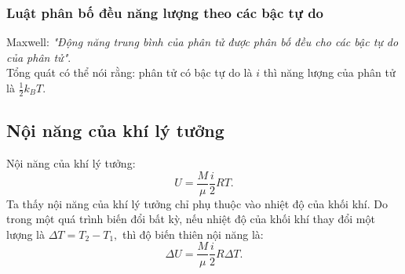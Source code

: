 \subsubsection{Luật phân bố đều năng lượng theo các bậc tự do}
Maxwell: \textit{"Động năng trung bình của phân tử được phân bố đều cho các bậc tự do của phân tử"}.\\
Tổng quát có thể nói rằng: phân tử có bậc tự do là $i$ thì năng lượng của phân tử là $\frac{1}{2} k_B T.$
\subsection{Nội năng của khí lý tưởng}
Nội năng của khí lý tưởng:
$$U = \frac{M}{\mu}  \frac{i}{2} RT.$$
Ta thấy nội năng của khí lý tưởng chỉ phụ thuộc vào nhiệt độ của khối khí. Do trong một quá trình biến đổi bất kỳ, nếu nhiệt độ của khối khí thay đổi một lượng là $\Delta T = T_2 - T_1,$ thì độ biến thiên nội năng là:
$$\Delta U = \frac{M}{\mu}  \frac{i}{2} R \Delta T.$$